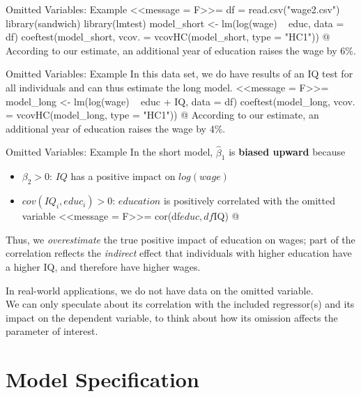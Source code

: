 \documentclass[11pt, aspectratio = 169]{beamer}
\begin{document}
\begin{frame}[fragile]{Omitted Variables: Example}
\footnotesize
<<message = F>>=
df = read.csv("wage2.csv")
library(sandwich)
library(lmtest)
model_short <- lm(log(wage) ~ educ, data = df)
coeftest(model_short, vcov. = vcovHC(model_short, type = "HC1"))
@
\normalsize
According to our estimate, an additional year of education raises the wage by 6\%.
\end{frame}


\begin{frame}[fragile]{Omitted Variables: Example}
In this data set, we do have results of an IQ test for all individuals and can thus estimate the long model.
\footnotesize
<<message = F>>=
model_long <- lm(log(wage) ~ educ + IQ, data = df)
coeftest(model_long, vcov. = vcovHC(model_long, type = "HC1"))
@
\normalsize
According to our estimate, an additional year of education raises the wage by 4\%.
\end{frame}

\begin{frame}[fragile]{Omitted Variables: Example}
In the short model, $\hat{\beta}_1$ is \textbf{\color{teal}biased upward} because 
\begin{itemize}
    \item $\beta_2 > 0$: $IQ$ has a positive impact on $log(wage)$
    \item $cov(IQ_i, educ_i) > 0$: $education$ is positively correlated with the omitted variable
    \footnotesize
<<message = F>>=
cor(df$educ, df$IQ)
@
\end{itemize}
Thus, we \textit{overestimate} the true positive impact of education on wages; part of the correlation reflects the \textit{indirect} effect that individuals with higher education have a higher IQ, and therefore have higher wages.

\bigskip

In real-world applications, we do not have data on the omitted variable. \\
We can only speculate about its correlation with the included regressor(s) and its impact on the dependent variable, to think about how its omission affects the parameter of interest.
\end{frame}

\section{Model Specification}
\end{document}
